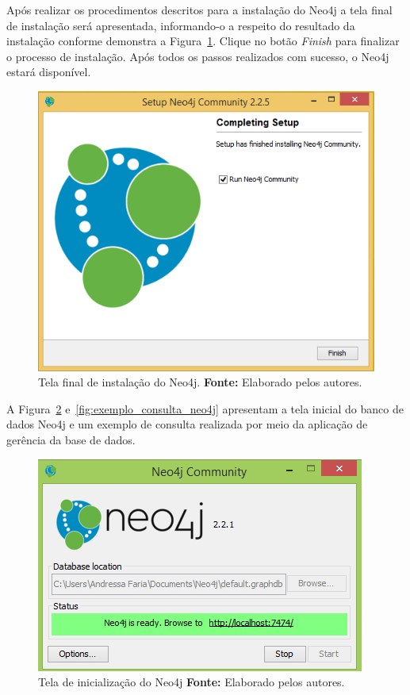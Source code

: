\par Após realizar os procedimentos descritos para a instalação do Neo4j a tela final de instalação será apresentada, informando-o a respeito do resultado da instalação conforme demonstra a Figura~\ref{fig:tela_final_neo4j}. Clique no botão \textit{Finish} para finalizar o processo de instalação.
Após todos os passos realizados com sucesso, o Neo4j estará disponível.

\begin{figure}[h!]
	\centerline{\includegraphics[scale=0.4]{./imagens/neo4j-install-step5.png}}
	\caption[Tela final de instalação do Neo4j]
	{Tela final de instalação do Neo4j. \textbf{Fonte:} Elaborado pelos autores.}
	\label{fig:tela_final_neo4j}
	
\end{figure}

\par A Figura~\ref{fig:tela_inicial_neo4j} e~\ref{fig:exemplo_consulta_neo4j} apresentam a tela inicial do banco de dados Neo4j e um exemplo de consulta realizada por meio da aplicação de gerência da base de dados.

\begin{figure}[h!]
	\centerline{\includegraphics[scale=0.60]{./imagens/neo4j.jpg}}
	\caption[Tela de inicialização do Neo4j ]
	{Tela de inicialização do Neo4j \textbf{Fonte:} Elaborado pelos autores.}
	\label{fig:tela_inicial_neo4j}
\end{figure}

